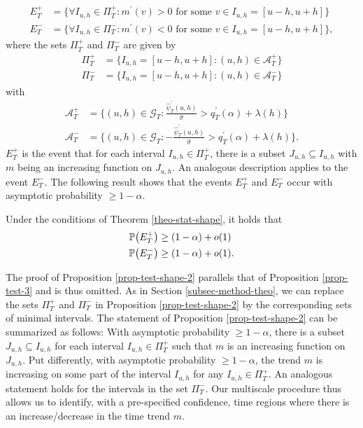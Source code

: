 \documentclass[a4paper,12pt]{article}
\numberwithin{equation}{section}
\begin{document}
\begin{align*}
E_T^+ & = \Big\{ \forall I_{u,h} \in \Pi_T^+: m^\prime(v) > 0 \text{ for some } v \in I_{u,h} = [u-h,u+h] \Big\} \\
E_T^- & = \Big\{ \forall I_{u,h} \in \Pi_T^-: m^\prime(v) < 0 \text{ for some } v \in I_{u,h} = [u-h,u+h] \Big\},
\end{align*}
where the sets $\Pi_T^+$ and $\Pi_T^-$ are given by
\begin{align*}
\Pi_T^+ & = \big\{ I_{u,h} = [u-h,u+h]: (u,h) \in \mathcal{A}_T^+ \big\} \\
\Pi_T^- & = \big\{ I_{u,h} = [u-h,u+h]: (u,h) \in \mathcal{A}_T^- \big\} 
\end{align*}
with 
\begin{align*}
\mathcal{A}_T^+ & = \Big\{ (u,h) \in \mathcal{G}_T: \frac{\widehat{\psi}_T^\prime(u,h)}{\widehat{\sigma}} > q_T^\prime(\alpha) + \lambda(h) \Big\} \\ 
\mathcal{A}_T^- & = \Big\{ (u,h) \in \mathcal{G}_T: -\frac{\widehat{\psi}_T^\prime(u,h)}{\widehat{\sigma}} > q_T^\prime(\alpha) + \lambda(h) \Big\}. 
\end{align*}
$E_T^+$ is the event that for each interval $I_{u,h} \in \Pi_T^+$, there is a subset $J_{u,h} \subseteq I_{u,h}$ with $m$ being an increasing function on $J_{u,h}$. An analogous description applies to the event $E_T^-$. The following result shows that the events $E_T^+$ and $E_T^-$ occur with asymptotic probability $\ge 1-\alpha$. 
\begin{prop}\label{prop-test-shape-2}
Under the conditions of Theorem \ref{theo-stat-shape}, it holds that  
\begin{align*}
\mathbb{P} \big( E_T^+ \big) & \ge (1-\alpha) + o(1) \\
\mathbb{P} \big( E_T^- \big) & \ge (1-\alpha) + o(1). 
\end{align*}
\end{prop}
The proof of Proposition \ref{prop-test-shape-2} parallels that of Proposition \ref{prop-test-3} and is thus omitted. As in Section \ref{subsec-method-theo}, we can replace the sets $\Pi_T^+$ and $\Pi_T^-$ in Proposition \ref{prop-test-shape-2} by the corresponding sets of minimal intervals. The statement of Proposition \ref{prop-test-shape-2} can be summarized as follows: With asymptotic probability $\ge 1-\alpha$, there is a subset $J_{u,h} \subseteq I_{u,h}$ for each interval $I_{u,h} \in \Pi_T^+$ such that $m$ is an increasing function on $J_{u,h}$. Put differently, with asymptotic probability $\ge 1- \alpha$, the trend $m$ is increasing on some part of the interval $I_{u,h}$ for any $I_{u,h} \in \Pi_T^+$. An analogous statement holds for the intervals in the set $\Pi_T^-$. Our multiscale procedure thus allows us to identify, with a pre-specified confidence, time regions where there is an increase/decrease in the time trend $m$. 
\end{document}
